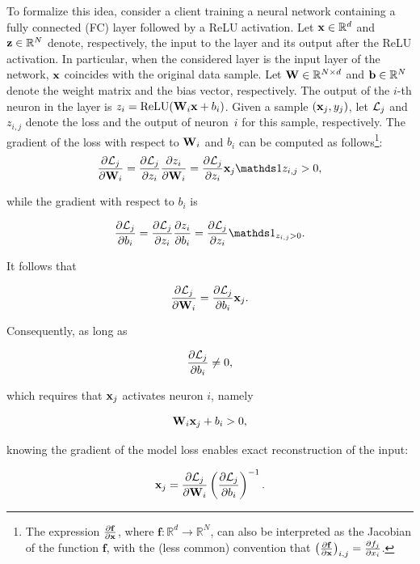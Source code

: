 To formalize this idea, consider a client training a neural network containing a fully connected (FC) layer followed by a ReLU activation. Let ${\mathbf{x}} \in \mathbb{R}^{d}$ and ${\mathbf{z}} \in \mathbb{R}^{N}$ denote, respectively, the input to the layer and its output after the ReLU activation. In particular, when the considered layer is the input layer of the network, ${\mathbf{x}}$ coincides with the original data sample.
Let $\mathbf{W} \in \mathbb{R}^{N \times d}$ and ${\mathbf{b}} \in \mathbb{R}^{N}$ denote the weight matrix and the bias vector, respectively. 
The output of the $i$-th neuron in the layer is $z_i = \textrm{ReLU}(\mathbf{W}_i {\mathbf{x}} + b_i)$. 
Given a sample $({\mathbf{x}}_j, y_j)$, let $\mathcal{L}_j$ and $z_{i,j}$ denote the loss and the output of neuron~$i$ for this sample, respectively. The gradient of the loss with respect to $\mathbf{W}_i$ and $b_i$ can be computed as follows\footnote{
 The expression $\frac{\partial\mathbf{f}}{\partial {\mathbf{x}}}$, where $\mathbf{f}: \mathbb R^d \to \mathbb{R}^N$, can also be interpreted as the Jacobian of the function $\mathbf f$, with the (less common) convention that 
$\left(\frac{\partial\mathbf{f}}{\partial {\mathbf{x}}}\right)_{i,j} = \frac{\partial f_j}{\partial x_i}$.
}:
\[
\frac{\partial \loss_j}{\partial \W_i}
=
\frac{\partial \loss_j}{\partial z_i}
\frac{\partial z_i}{\partial \W_i}
=
\frac{\partial \loss_j}{\partial z_i}
\x_j
\indicator{z_{i,j}>0},
\]

while the gradient with respect to $b_i$ is

\[
\frac{\partial \loss_j}{\partial b_i}
=
\frac{\partial \loss_j}{\partial z_i}
\frac{\partial z_i}{\partial b_i}
=
\frac{\partial \loss_j}{\partial z_i}
\indicator_{z_{i,j}>0}.
\]

It follows that

\[
\frac{\partial \mathcal{L}_j}{\partial \mathbf{W}_i}
=
\frac{\partial \mathcal{L}_j}{\partial b_i}
{\mathbf{x}}_j.
\]

Consequently, as long as

\[
\frac{\partial \mathcal{L}_j}{\partial b_i} \neq 0,
\]

which requires that ${\mathbf{x}}_j$ activates neuron $i$, namely

\[
\mathbf{W}_i {\mathbf{x}}_j + b_i > 0,
\]

knowing the gradient of the model loss enables exact reconstruction of the input:

\begin{equation}\label{eq:single_input_rec}
{\mathbf{x}}_j
=
\frac{\partial \mathcal{L}_j}{\partial \mathbf{W}_i}
\left(
\frac{\partial \mathcal{L}_j}{\partial b_i}
\right)^{-1}.
\end{equation}



